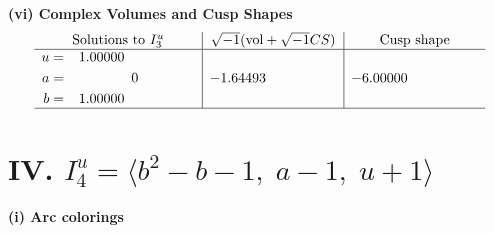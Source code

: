 \documentclass[1p]{elsarticle_modified}
\theoremstyle{definition}
\newcommand{\I}{\sqrt{-1}}
\begin{document}
\newpage\flushleft \textbf{(vi) Complex Volumes and Cusp Shapes}
$$\begin{array}{c|c|c}  
\text{Solutions to }I^u_{3}& \I (\text{vol} + \sqrt{-1}CS) & \text{Cusp shape}\\
 \hline 
\begin{aligned}
u &= \phantom{-}1.00000\phantom{ +0.000000I} \\
a &= \phantom{-0.000000 } 0 \\
b &= \phantom{-}1.00000\phantom{ +0.000000I}\end{aligned}
 & -1.64493\phantom{ +0.000000I} & -6.00000\phantom{ +0.000000I}\\
 \hline 
 \end{array}$$\newpage\newpage\renewcommand{\arraystretch}{1}
\centering \section*{IV. $I^u_{4}= \langle b^2- b-1,\;a-1,\;u+1 \rangle$}
\flushleft \textbf{(i) Arc colorings}\\
\end{document}

